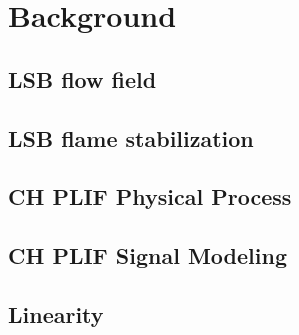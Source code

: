 \chapter{Background}






\section{LSB flow field}

\section{LSB flame stabilization}

\section{CH PLIF Physical Process}

\section{CH PLIF Signal Modeling}

\section{Linearity}

